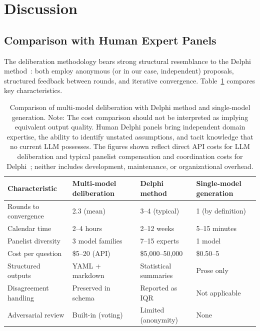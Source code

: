 \documentclass[11pt,a4paper]{article}
\begin{document}
\section{Discussion}
\label{sec:discussion}

\subsection{Comparison with Human Expert Panels}

The deliberation methodology bears strong structural resemblance to the Delphi method~\cite{linstone1975delphi}: both employ anonymous (or in our case, independent) proposals, structured feedback between rounds, and iterative convergence. Table~\ref{tab:comparison} compares key characteristics.

\begin{table}[ht]
\centering
\caption{Comparison of multi-model deliberation with Delphi method and single-model generation. Note: The cost comparison should not be interpreted as implying equivalent output quality. Human Delphi panels bring independent domain expertise, the ability to identify unstated assumptions, and tacit knowledge that no current LLM possesses. The figures shown reflect direct API costs for LLM deliberation and typical panelist compensation and coordination costs for Delphi~\cite{linstone1975delphi}; neither includes development, maintenance, or organizational overhead.}
\label{tab:comparison}
\begin{tabular}{@{}p{3cm}p{3.5cm}p{3.5cm}p{3cm}@{}}
\toprule
\textbf{Characteristic} & \textbf{Multi-model deliberation} & \textbf{Delphi method} & \textbf{Single-model generation} \\
\midrule
Rounds to convergence & 2.3 (mean) & 3--4 (typical) & 1 (by definition) \\
Calendar time & 2--4 hours & 2--12 weeks & 5--15 minutes \\
Panelist diversity & 3 model families & 7--15 experts & 1 model \\
Cost per question & \$5--20 (API) & \$5{,}000--50{,}000 & \$0.50--5 \\
Structured outputs & YAML + markdown & Statistical summaries & Prose only \\
Disagreement handling & Preserved in schema & Reported as IQR & Not applicable \\
Adversarial review & Built-in (voting) & Limited (anonymity) & None \\
\bottomrule
\end{tabular}
\end{table}
\end{document}
